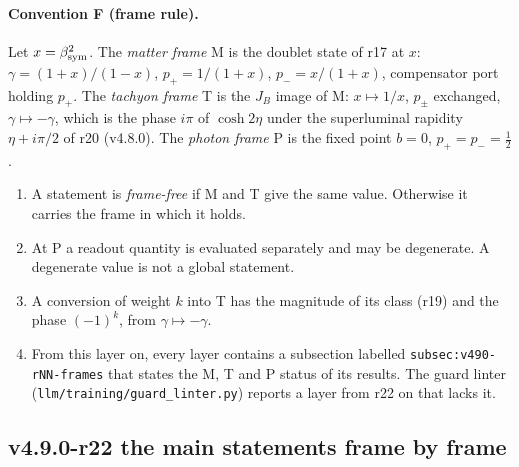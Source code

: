 \paragraph{Convention F (frame rule).}
Let \(x=\beta_{\mathrm{sym}}^2\).  The \emph{matter frame} M is the doublet state of r17 at \(x\): \(\gamma=(1+x)/(1-x)\),
\(p_+=1/(1+x)\), \(p_-=x/(1+x)\), compensator port holding \(p_+\).  The \emph{tachyon frame} T is the \(J_B\) image of M:
\(x\mapsto1/x\), \(p_\pm\) exchanged, \(\gamma\mapsto-\gamma\), which is the phase \(i\pi\) of \(\cosh2\eta\) under the superluminal
rapidity \(\eta+i\pi/2\) of r20 (v4.8.0).  The \emph{photon frame} P is the fixed point \(b=0\), \(p_+=p_-=\tfrac12\).
\begin{enumerate}[leftmargin=2em]
\item[(F1)] A statement is \emph{frame-free} if M and T give the same value.  Otherwise it carries the frame in which it holds.
\item[(F2)] At P a readout quantity is evaluated separately and may be degenerate.  A degenerate value is not a global statement.
\item[(F3)] A conversion of weight \(k\) into T has the magnitude of its class (r19) and the phase \((-1)^k\), from \(\gamma\mapsto-\gamma\).
\item[(F4)] From this layer on, every layer contains a subsection labelled \texttt{subsec:v490-rNN-frames} that states the M, T and P
status of its results.  The guard linter (\texttt{llm/training/guard\_linter.py}) reports a layer from r22 on that lacks it.
\end{enumerate}

\subsection*{v4.9.0-r22 the main statements frame by frame}
\label{subsec:v490-r22-statements}

